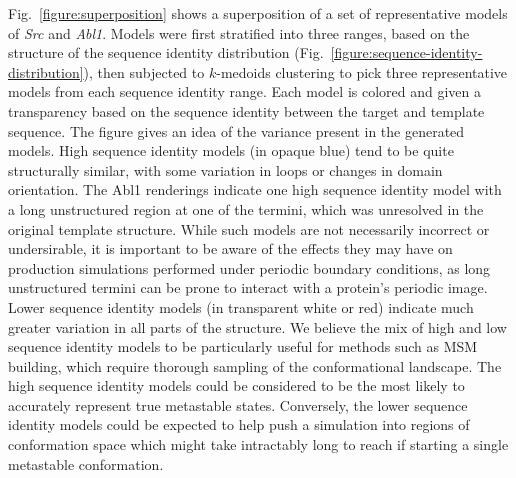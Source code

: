 \documentclass[aps,pre,twocolumn,nofootinbib,superscriptaddress,linenumbers]{revtex4-1}
\begin{document}
Fig.~\ref{figure:superposition} shows a superposition of a set of representative models of \emph{Src} and \emph{Abl1}.
Models were first stratified into three ranges, based on the structure of the sequence identity distribution (Fig.~\ref{figure:sequence-identity-distribution}), then subjected to $k$-medoids clustering to pick three representative models from each sequence identity range.
Each model is colored and given a transparency based on the sequence identity between the target and template sequence.
The figure gives an idea of the variance present in the generated models.
High sequence identity models (in opaque blue) tend to be quite structurally similar, with some variation in loops or changes in domain orientation.
The Abl1 renderings indicate one high sequence identity model with a long unstructured region at one of the termini, which was unresolved in the original template structure.
While such models are not necessarily incorrect or undersirable, it is important to be aware of the effects they may have on production simulations performed under periodic boundary conditions, as long unstructured termini can be prone to interact with a protein's periodic image.
Lower sequence identity models (in transparent white or red) indicate much greater variation in all parts of the structure.
We believe the mix of high and low sequence identity models to be particularly useful for methods such as MSM building, which require thorough sampling of the conformational landscape.
The high sequence identity models could be considered to be the most likely to accurately represent true metastable states.
Conversely, the lower sequence identity models could be expected to help push a simulation into regions of conformation space which might take intractably long to reach if starting a single metastable conformation.
\end{document}

